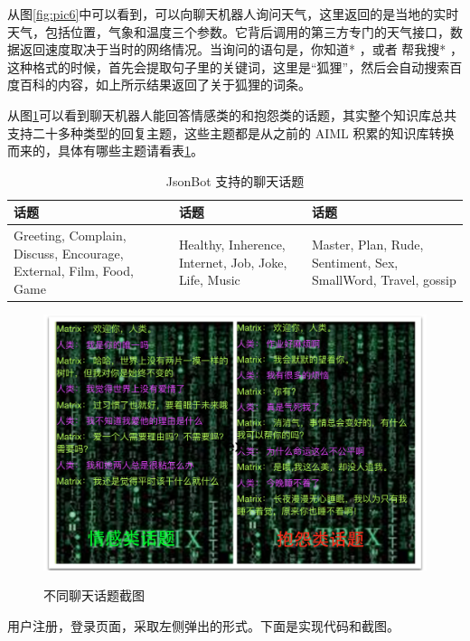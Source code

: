 \documentclass[bachelor,winfonts]{jnuthesis}
\begin{document}
从图\ref{fig:pic6}中可以看到，可以向聊天机器人询问天气，这里返回的是当地的实时天气，包括位置，气象和温度三个参数。它背后调用的第三方专门的天气接口，数据返回速度取决于当时的网络情况。当询问的语句是，你知道* ，或者 帮我搜* ，这种格式的时候，首先会提取句子里的关键词，这里是“狐狸”，然后会自动搜索百度百科的内容，如上所示结果返回了关于狐狸的词条。



从图\ref{fig:pic7}可以看到聊天机器人能回答情感类的和抱怨类的话题，其实整个知识库总共支持二十多种类型的回复主题，这些主题都是从之前的 AIML 积累的知识库转换而来的，具体有哪些主题请看表\ref{table:t3}。

\begin{table}[H]
  \centering
  \begin{tabular}{p{38mm}p{38mm}p{38mm}}
    \toprule
    \textbf{话题} & \textbf{话题} & \textbf{话题}\\
    \midrule
    Greeting, Complain, Discuss, Encourage, External, Film, Food, Game & Healthy, Inherence, Internet, Job, Joke, Life, Music & Master, Plan, Rude, Sentiment, Sex, SmallWord, Travel, gossip\\
    \bottomrule
  \end{tabular}
  \caption{JsonBot 支持的聊天话题}\label{table:t3}
\end{table}

\begin{figure}[H]
  \centering
  \includegraphics[width= 1.0\textwidth]{chattopic.png}\\
  \caption{不同聊天话题截图}\label{fig:pic7}
\end{figure}

用户注册，登录页面，采取左侧弹出的形式。下面是实现代码和截图。
\end{document}
